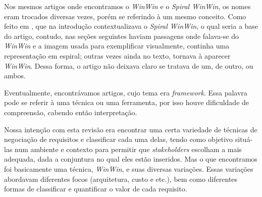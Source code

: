 Nos mesmos artigos onde encontramos o \textit{WinWin} e o \textit{Spiral
WinWin}, os nomes eram trocados diversas vezes, porém se referindo à um mesmo
conceito.
Como feito em \cite{boehm2006winwin}, que na introdução contextualizava o \textit{Spiral WinWin}, o qual seria a base do artigo, contudo, nas seções seguintes haviam passagens onde
falava-se do \textit{WinWin} e a imagem usada para exemplificar visualmente,
continha uma representação em espiral; outras vezes ainda no texto, tornava à aparecer
\textit{WinWin}. Dessa forma, o artigo não deixava claro se tratava de um, de
outro, ou ambos.

Eventualmente, encontrávamos artigos, cujo tema era \textit{framework}. Essa
palavra pode se referir à uma técnica ou uma ferramenta, por isso houve dificuldade de
compreensão, cabendo então interpretação.

Nossa intenção com esta revisão era encontrar uma certa variedade de técnicas de
negociação de requisitos e classificar cada uma delas, tendo como objetivo
situá-las num ambiente e contexto para permitir que \textit{stakeholders}
escolham a mais adequada, dada a conjuntura no qual eles estão inseridos. Mas o
que encontramos foi basicamente uma técnica, \textit{WinWin}, e suas diversas variações. Essas
variações abordavam diferentes focos (arquitetura, custo e etc.), bem como
diferentes formas de classificar e quantificar o valor de cada requisito.